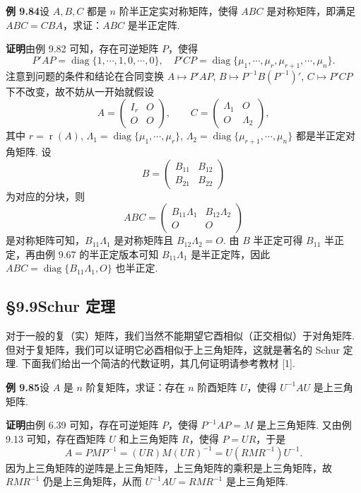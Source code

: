 \documentclass[UTF8, 12pt, fontset=fandol, oneside]{ctexart}
\begin{document}
\noindent\textbf{例 9.84}\quad 设 $A,B,C$ 都是 $n$ 阶半正定实对称矩阵，使得 $ABC$ 是对称矩阵，即满足 $ABC=CBA$，求证：$ABC$ 是半正定阵.

\noindent\textbf{证明}\quad 由例 9.82 可知，存在可逆矩阵 $P$，使得
\[
P'AP=\operatorname{diag}\{1,\cdots,1,0,\cdots,0\},\quad
P'CP=\operatorname{diag}\{\mu_1,\cdots,\mu_r,\mu_{r+1},\cdots,\mu_n\}.
\]
注意到问题的条件和结论在合同变换 $A\mapsto P'AP$, $B\mapsto P^{-1}B(P^{-1})'$, $C\mapsto P'CP$ 下不改变，故不妨从一开始就假设
\[
A=\begin{pmatrix}I_r&O\\O&O\end{pmatrix},\qquad
C=\begin{pmatrix}\Lambda_1&O\\O&\Lambda_2\end{pmatrix},
\]
其中 $r=\operatorname{r}(A)$, $\Lambda_1=\operatorname{diag}\{\mu_1,\cdots,\mu_r\}$, $\Lambda_2=\operatorname{diag}\{\mu_{r+1},\cdots,\mu_n\}$ 都是半正定对角矩阵. 设
\[
B=\begin{pmatrix}
B_{11}&B_{12}\\
B_{21}&B_{22}
\end{pmatrix}
\]
为对应的分块，则
\[
ABC=\begin{pmatrix}
B_{11}\Lambda_1&B_{12}\Lambda_2\\
O&O
\end{pmatrix}
\]
是对称矩阵可知，$B_{11}\Lambda_1$ 是对称矩阵且 $B_{12}\Lambda_2=O$. 由 $B$ 半正定可得 $B_{11}$ 半正定，再由例 9.67 的半正定版本可知 $B_{11}\Lambda_1$ 是半正定阵，因此 $ABC=\operatorname{diag}\{B_{11}\Lambda_1,O\}$ 也半正定.

\subsection*{§9.9\quad Schur 定理}

对于一般的复（实）矩阵，我们当然不能期望它酉相似（正交相似）于对角矩阵. 但对于复矩阵，我们可以证明它必酉相似于上三角矩阵，这就是著名的 Schur 定理. 下面我们给出一个简洁的代数证明，其几何证明请参考教材 [1].

\noindent\textbf{例 9.85}\quad 设 $A$ 是 $n$ 阶复矩阵，求证：存在 $n$ 阶酉矩阵 $U$，使得 $U^{-1}AU$ 是上三角矩阵.

\noindent\textbf{证明}\quad 由例 6.39 可知，存在可逆矩阵 $P$，使得 $P^{-1}AP=M$ 是上三角矩阵. 又由例 9.13 可知，存在酉矩阵 $U$ 和上三角矩阵 $R$，使得 $P=UR$，于是
\[
A=PMP^{-1}=(UR)M(UR)^{-1}=U(RMR^{-1})U^{-1}.
\]
因为上三角矩阵的逆阵是上三角矩阵，上三角矩阵的乘积是上三角矩阵，故 $RMR^{-1}$ 仍是上三角矩阵，从而 $U^{-1}AU=RMR^{-1}$ 是上三角矩阵.
\end{document}
